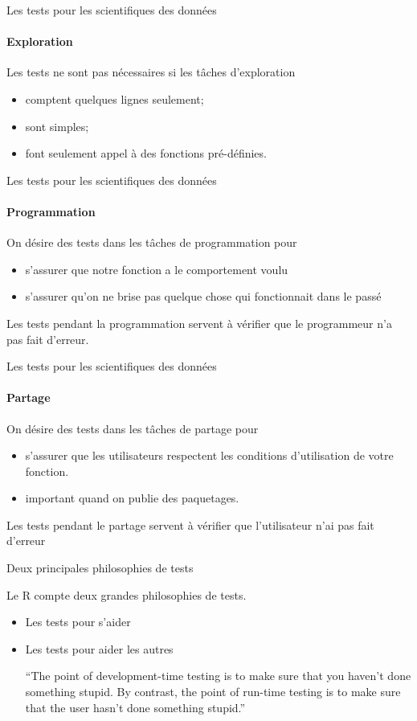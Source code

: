\documentclass[11pt]{beamer}
\begin{document}
\begin{frame}{Les tests pour les scientifiques des données}
\framesubtitle{Exploration}
Les tests ne sont pas nécessaires si les tâches d'exploration
\begin{itemize}
\item comptent quelques lignes seulement;
\item sont simples;
\item font seulement appel à des fonctions pré-définies.
\end{itemize}
\end{frame}

\begin{frame}{Les tests pour les scientifiques des données}
\framesubtitle{Programmation}
On désire des tests dans les tâches de programmation pour
\begin{itemize}
\item s'assurer que notre fonction a le comportement voulu
\item s'assurer qu'on ne brise pas quelque chose qui fonctionnait dans le passé
\end{itemize}
Les tests pendant la programmation servent à vérifier que le programmeur n'a pas fait d'erreur.
\end{frame}

\begin{frame}{Les tests pour les scientifiques des données}
\framesubtitle{Partage}
On désire des tests dans les tâches de partage pour
\begin{itemize}
\item s'assurer que les utilisateurs respectent les conditions d'utilisation de votre fonction.
\item important quand on publie des paquetages.
\end{itemize}
Les tests pendant le partage servent à vérifier que l'utilisateur n'ai pas fait d'erreur
\end{frame}

\begin{frame}{Deux principales philosophies de tests}

Le \textsf{R} compte deux grandes philosophies de tests.

\begin{itemize}
\item Les tests pour s'aider
\item Les tests pour aider les autres
\begin{block}{}
{\large ``The point of development-time testing is to make sure that you
haven’t done something stupid. By contrast, the point of run-time
testing is to make sure that the user hasn’t done something stupid.''}
\vskip5mm
\hspace*{}
\end{block}

\end{itemize}
\end{frame}
\end{document}
